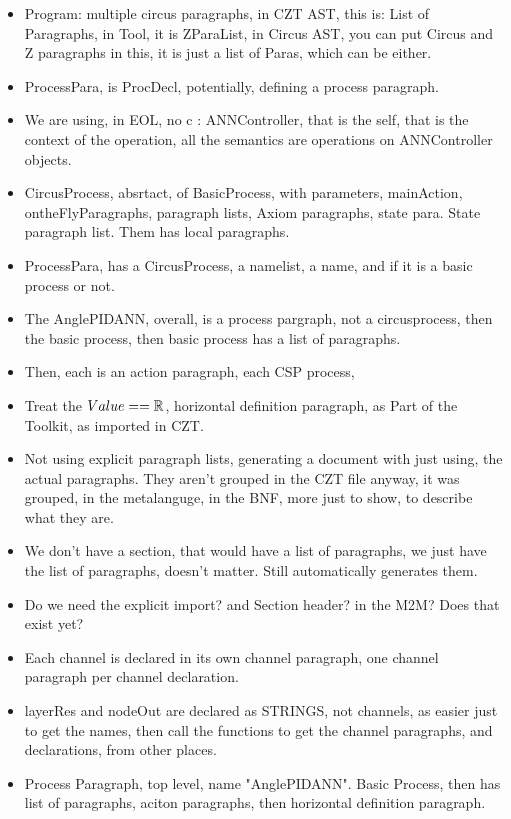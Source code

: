 \documentclass{article}
\begin{document}
\begin{itemize}
  \item Program: multiple circus paragraphs, in CZT AST, this is: List of Paragraphs, in Tool, it is ZParaList, in Circus AST, you can put Circus and Z paragraphs in this, it is just a list of Paras, which can be either. 
   
  \item ProcessPara, is ProcDecl, potentially, defining a process paragraph. 
  \item We are using, in EOL, no c : ANNController, that is the self, that is the context of the operation, all the semantics are operations on ANNController objects. 
  \item CircusProcess, absrtact, of BasicProcess, with parameters, mainAction, ontheFlyParagraphs, paragraph lists, Axiom paragraphs, state para. State paragraph list. Them has local paragraphs. 
  \item ProcessPara, has a CircusProcess, a namelist, a name, and if it is a basic process or not. 
  \item The AnglePIDANN, overall, is a process pargraph, not a circusprocess, then the basic process, then basic process has a list of paragraphs. 
  \item Then, each is an action paragraph, each CSP process, 
  \item Treat the $Value == \mathbb{R}$, horizontal definition paragraph, as Part of the Toolkit, as imported in CZT. 
  \item Not using explicit paragraph lists, generating a document with just using, the actual paragraphs. They aren't grouped in the CZT file anyway, it was grouped, in the metalanguge, in the BNF, more just to show, to describe what they are. 
  \item We don't have a section, that would have a list of paragraphs, we just have the list of paragraphs, doesn't matter. Still automatically generates them. 
  \item Do we need the explicit import? and Section header? in the M2M? Does that exist yet? 
  \item Each channel is declared in its own channel paragraph, one channel paragraph per channel declaration.
  \item layerRes and nodeOut are declared as STRINGS, not channels, as easier just to get the names, then call the functions to get the channel paragraphs, and declarations, from other places. 
  \item Process Paragraph, top level, name "AnglePIDANN". Basic Process, then has list of paragraphs, aciton paragraphs, then horizontal definition paragraph. 

\end{itemize}
\end{document}
